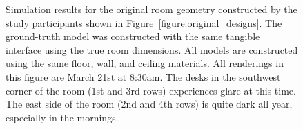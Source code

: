 \begin{figure}[t]
\caption{ Simulation results for the original room geometry
  constructed by the study participants shown in
  Figure~\ref{figure:original_designs}.  The ground-truth model was
  constructed with the same tangible interface using the true room
  dimensions.  All models are constructed using the same floor, wall,
  and ceiling materials.  All renderings in this figure are March 21st
  at 8:30am.  The desks in the southwest corner of the room (1st and
  3rd rows) experiences glare at this time.  The east side of the room
  (2nd and 4th rows) is quite dark all year, especially in the
  mornings.  }
\vspace{-0.1in}
\label{figure:renderingsOfOriginalGeometry}
\end{figure}
